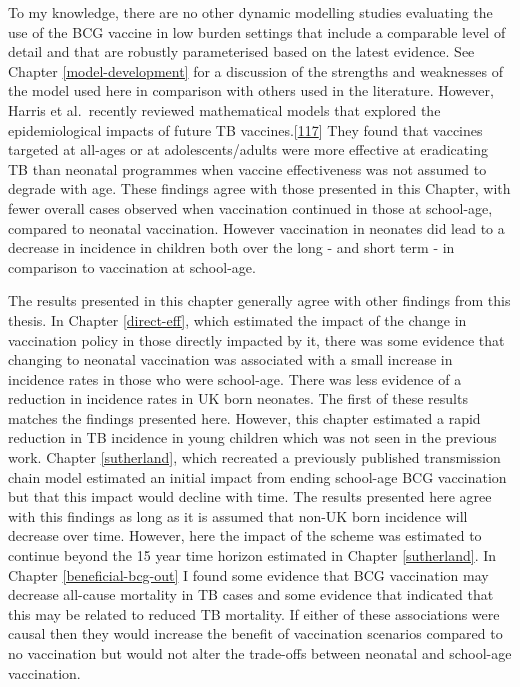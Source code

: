 \documentclass[11pt,twoside]{bristolthesis}
\begin{document}
  To my knowledge, there are no other dynamic modelling studies evaluating the use of the BCG vaccine in low burden settings that include a comparable level of detail and that are robustly parameterised based on the latest evidence. See Chapter \ref{model-development} for a discussion of the strengths and weaknesses of the model used here in comparison with others used in the literature. However, Harris et al.~recently reviewed mathematical models that explored the epidemiological impacts of future TB vaccines.{[}\protect\hyperlink{ref-Harris2016}{117}{]} They found that vaccines targeted at all-ages or at adolescents/adults were more effective at eradicating TB than neonatal programmes when vaccine effectiveness was not assumed to degrade with age. These findings agree with those presented in this Chapter, with fewer overall cases observed when vaccination continued in those at school-age, compared to neonatal vaccination. However vaccination in neonates did lead to a decrease in incidence in children both over the long - and short term - in comparison to vaccination at school-age.
  
  The results presented in this chapter generally agree with other findings from this thesis. In Chapter \ref{direct-eff}, which estimated the impact of the change in vaccination policy in those directly impacted by it, there was some evidence that changing to neonatal vaccination was associated with a small increase in incidence rates in those who were school-age. There was less evidence of a reduction in incidence rates in UK born neonates. The first of these results matches the findings presented here. However, this chapter estimated a rapid reduction in TB incidence in young children which was not seen in the previous work. Chapter \ref{sutherland}, which recreated a previously published transmission chain model estimated an initial impact from ending school-age BCG vaccination but that this impact would decline with time. The results presented here agree with this findings as long as it is assumed that non-UK born incidence will decrease over time. However, here the impact of the scheme was estimated to continue beyond the 15 year time horizon estimated in Chapter \ref{sutherland}. In Chapter \ref{beneficial-bcg-out} I found some evidence that BCG vaccination may decrease all-cause mortality in TB cases and some evidence that indicated that this may be related to reduced TB mortality. If either of these associations were causal then they would increase the benefit of vaccination scenarios compared to no vaccination but would not alter the trade-offs between neonatal and school-age vaccination.
  
\end{document}
